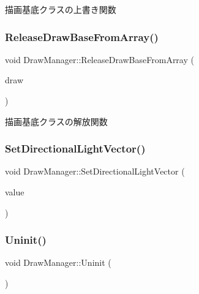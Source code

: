描画基底クラスの上書き関数 

\mbox{\label{class_draw_manager_a287d1f359b87f075b22df6a9b6e99316}} 
\subsubsection{\texorpdfstring{Release\+Draw\+Base\+From\+Array()}{ReleaseDrawBaseFromArray()}}
{\footnotesize\ttfamily void Draw\+Manager\+::\+Release\+Draw\+Base\+From\+Array (\begin{DoxyParamCaption}\item[{\mbox{\hyperlink{class_draw_base}{Draw\+Base}} $\ast$}]{draw }\end{DoxyParamCaption})}



描画基底クラスの解放関数 

\mbox{\label{class_draw_manager_a470edae8248d36956a02bab7e59a4140}} 
\subsubsection{\texorpdfstring{Set\+Directional\+Light\+Vector()}{SetDirectionalLightVector()}}
{\footnotesize\ttfamily void Draw\+Manager\+::\+Set\+Directional\+Light\+Vector (\begin{DoxyParamCaption}\item[{\mbox{\hyperlink{_vector3_d_8h_ab16f59e4393f29a01ec8b9bbbabbe65d}{Vec3}}}]{value }\end{DoxyParamCaption})\hspace{0.3cm}{\ttfamily [inline]}}

\mbox{\label{class_draw_manager_ae58095d9d734f30211011e9205aa57aa}} 
\subsubsection{\texorpdfstring{Uninit()}{Uninit()}}
{\footnotesize\ttfamily void Draw\+Manager\+::\+Uninit (\begin{DoxyParamCaption}{ }\end{DoxyParamCaption})}



